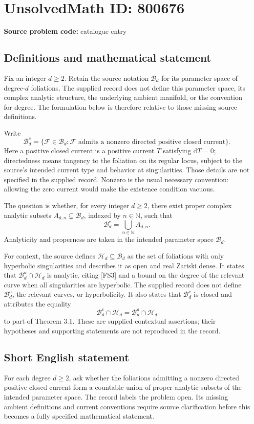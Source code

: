 \documentclass[11pt]{article}
\newcommand{\N}{\mathbb{N}}
\begin{document}
\section*{UnsolvedMath ID: 800676}
\textbf{Source problem code:} catalogue entry
\subsection{Definitions and mathematical statement}
Fix an integer \(d\geq 2\). Retain the source notation \(\mathscr{B}_d\) for its parameter space of degree-\(d\) foliations. The supplied record does not define this parameter space, its complex analytic structure, the underlying ambient manifold, or the convention for degree. The formulation below is therefore relative to those missing source definitions.

Write
\[
\mathscr{B}_d^{c}=\{\mathcal{F}\in\mathscr{B}_d: \mathcal{F}\text{ admits a nonzero directed positive closed current}\}.
\]
Here a positive closed current is a positive current \(T\) satisfying \(\mathrm{d}T=0\); directedness means tangency to the foliation on its regular locus, subject to the source's intended current type and behavior at singularities. Those details are not specified in the supplied record. Nonzero is the usual necessary convention: allowing the zero current would make the existence condition vacuous.

The question is whether, for every integer \(d\geq2\), there exist proper complex analytic subsets \(A_{d,n}\subsetneq\mathscr{B}_d\), indexed by \(n\in\N\), such that
\[
\mathscr{B}_d^{c}=\bigcup_{n\in\N}A_{d,n}.
\]
Analyticity and properness are taken in the intended parameter space \(\mathscr{B}_d\).

For context, the source defines \(\mathscr{H}_d\subseteq\mathscr{B}_d\) as the set of foliations with only hyperbolic singularities and describes it as open and real Zariski dense. It states that \(\mathscr{B}_d^{a}\cap\mathscr{H}_d\) is analytic, citing [FS3] and a bound on the degree of the relevant curve when all singularities are hyperbolic. The supplied record does not define \(\mathscr{B}_d^{a}\), the relevant curves, or hyperbolicity. It also states that \(\mathscr{B}_d^{c}\) is closed and attributes the equality
\[
\mathscr{B}_d^{c}\cap\mathscr{H}_d
=
\mathscr{B}_d^{a}\cap\mathscr{H}_d
\]
to part of Theorem 3.1. These are supplied contextual assertions; their hypotheses and supporting statements are not reproduced in the record.
\subsection{Short English statement}
For each degree \(d\geq2\), ask whether the foliations admitting a nonzero directed positive closed current form a countable union of proper analytic subsets of the intended parameter space. The record labels the problem open. Its missing ambient definitions and current conventions require source clarification before this becomes a fully specified mathematical statement.
\end{document}

